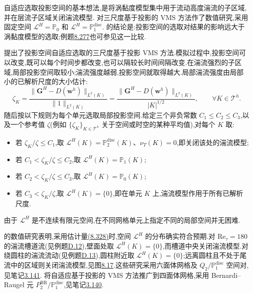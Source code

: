 \begin{note}
\label{note:vms-coarse-projection-adaptive-space}
自适应选取投影空间的基本想法,是将涡黏度模型集中用于流动高度湍流的子区域,并在层流子区域关闭湍流模型.
\textcite{JohnKaya2005,JohnKaya2008,JohnRoland2007,JohnKindl2010a} 对三尺度基于投影的 VMS 方法作了数值研究,采用固定空间 $\mathcal L^H=\mathbb P_0$ 和 $\mathcal L^H=\mathbb P_1^{\mathrm{disc}}$.\textcite{JohnKindl2010a} 的结论是:投影空间的选取对结果的影响远大于涡黏度模型的选取;例题\hyperref[ex:vms-coarse-projection-channel-flow]{8.277}也可参见这一比较.

\textcite{JohnKindl2010b} 提出了投影空间自适应选取的三尺度基于投影 VMS 方法.模拟过程中,投影空间可以改变,既可以每个时间步都改变,也可以隔较长时间间隔改变.在湍流强烈的子区域,局部投影空间取较小;湍流强度越弱,投影空间就取得越大.局部湍流强度由局部小的已解析尺度的大小估计:
\begin{equation}\label{eq:vms-coarse-projection-local-turbulence-intensity}
 \zeta_K=
 \frac{\|\bm G^H-D(\bm w^h)\|_{L^2(K)}}
      {\|1\|_{L^2(K)}}
 =\frac{\|\bm G^H-D(\bm w^h)\|_{L^2(K)}}{|K|^{1/2}},
 \qquad\forall K\in\mathcal T^h.
\end{equation}
随后按以下规则为每个单元选取局部投影空间.给定三个非负常数 $C_1\le C_2\le C_3$,以及一个参考值 $\zeta$(例如 $\{\zeta_K\}_{K\in\mathcal T^h}$ 关于空间或时空的某种平均值),对每个 $K$ 取:
\begin{itemize}
 \item 若 $\zeta_K/\zeta\le C_1$,取 $\mathcal L^H(K)=\mathbb P_2^{\mathrm{disc}}(K)$、$\nu_T(K)=0$,即关闭该处的湍流模型;
 \item 若 $C_1<\zeta_K/\zeta\le C_2$,取 $\mathcal L^H(K)=\mathbb P_1(K)$;
 \item 若 $C_2<\zeta_K/\zeta\le C_3$,取 $\mathcal L^H(K)=\mathbb P_0(K)$;
 \item 若 $C_3<\zeta_K/\zeta$,取 $\mathcal L^H(K)=\{0\}$,即在单元 $K$ 上,湍流模型作用于所有已解析尺度.
\end{itemize}
由于 $\mathcal L^H$ 是不连续有限元空间,在不同网格单元上指定不同的局部空间并无困难.

\textcite{JohnKindl2010b} 的数值研究表明,采用估计量\hyperref[eq:vms-coarse-projection-local-turbulence-intensity]{(8.328)}时,空间 $\mathcal L^H$ 的分布确实符合预期.对 $\mathrm{Re}_\tau=180$ 的湍流槽道流(见例题\hyperref[ex:appendix-d-12]{D.12}),壁面处取 $\mathcal L^H(K)=\{0\}$,而槽道中央关闭湍流模型.对绕圆柱的湍流流动(见例题\hyperref[ex:appendix-d-13]{D.13}),圆柱附近取 $\mathcal L^H(K)=\{0\}$;远离圆柱且不处于尾流中的区域则关闭湍流模型,见图\hyperref[fig:vms-adaptive-cylinder-flow]{8.17}.这些研究采用六面体网格及 $Q_2/\mathbb P_1^{\mathrm{disc}}$ 空间对,见笔记\hyperref[note:qk-pdisc-mapped-unmapped]{3.141}.\textcite{JohnKindlSuciu2010} 将自适应基于投影的 VMS 方法推广到四面体网格,采用 Bernardi--Raugel 元 $P_2^{\mathrm{BR}}/\mathbb P_1^{\mathrm{disc}}$,见笔记\hyperref[note:bernardi-raugel-second-order-3d]{3.140}.
\end{note}

